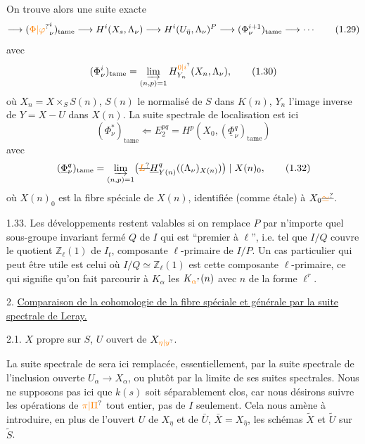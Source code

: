 On trouve alors une suite exacte
\[
\longrightarrow({\unsure{\Phi|\varphi}}^i_\nu)_{\mathrm{tame}}\longrightarrow H^i(X_s,\Lambda_\nu)\longrightarrow H^i(U_{\bar\eta},\Lambda_\nu)^P\longrightarrow(\Phi^{i+1}_\nu)_{\mathrm{tame}}\longrightarrow\cdots
\tag*{(1.29)}
\]
avec
\[
(\Phi^i_\nu)_{\mathrm{tame}}=\varinjlim_{(n,p)=1}H^{\unsure{0|i}}_{Y_n}(X_n,\Lambda_\nu),
\tag*{(1.30)}
\]
où $X_n=X\times_S S(n)$, $S(n)$ le normalisé de $S$ dans $K(n)$, $Y_n$ l'image inverse de $Y=X-U$ dans $X(n)$. La suite spectrale de localisation est ici
\[
(\Phi^*_\nu)_{\mathrm{tame}}\Longleftarrow E_2^{pq}=H^p(X_0,(\underline\Phi^q_\nu)_{\mathrm{tame}})
\tag*{(1.31)}
\]
avec
\[
(\underline\Phi^q_\nu)_{\mathrm{tame}}=\varinjlim_{(n,p)=1}\bigl(\deleted{\unsure{L}}\underline H^q_{Y(n)}((\Lambda_\nu)_{X(n)})\bigr)\mid X(n)_0,
\tag*{(1.32)}
\]
où $X(n)_0$ est la  fibre spéciale de $X(n)$, identifiée (comme  étale) à $X_0\deleted{\unsure{\simeq}}$.


1.33. Les développements restent valables  si on remplace $P$ par n'importe quel sous-groupe invariant fermé $Q$ de $I$  qui est ``premier à $\ell$'', i.e. tel que $I/Q$ couvre le quotient $\mathbb Z_\ell(1)$ de $I_t$, composante $\ell$-primaire de $I/P$. Un cas particulier  qui peut être utile est celui où $I/Q\simeq\mathbb Z_\ell(1)$ est cette composante $\ell$-primaire, ce qui signifie qu'on fait parcourir à $K_\alpha$ les  $K_{\unsure{\alpha}}(n)$ avec $n$ de la forme $\ell^r$. 

2. \uline{Comparaison de la cohomologie de la fibre spéciale et générale par la suite spectrale de Leray.}

2.1. $X$ propre sur $S$, $U$ ouvert de $X_{\unsure{\eta|y}}$.

La suite spectrale de   sera ici remplacée, essentiellement, par la suite spectrale  de l'inclusion ouverte $U_\alpha\longrightarrow X_\alpha$, ou plutôt par la limite de ses suites spectrales.  Nous ne supposons pas ici que $k(s)$ soit séparablement clos, car nous désirons   suivre les opérations de $\unsure{\pi|\Pi}$ tout entier, pas de $I$ seulement. Cela nous amène à introduire, en plus de l'ouvert $U$ de $X_\eta$ et de $\bar U$, $\bar X=X_{\bar\eta}$, les schémas  $\tilde X$ et $\tilde U$ sur $\tilde S$.

